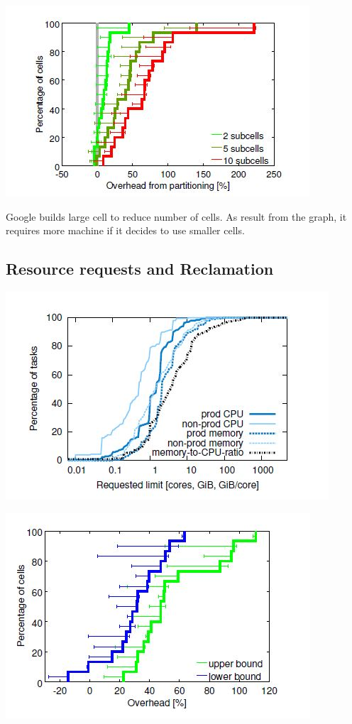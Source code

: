 \documentclass[runningheads,a4paper]{llncs}
\begin{document}
\includegraphics{LargeCell2}

Google builds large cell to reduce number of cells. As result from the graph, it requires more machine if it decides to use smaller cells. 

\subsection{Resource requests and Reclamation}

\includegraphics{resourceRequest1}

\includegraphics{resourceRequest2}
\end{document}
